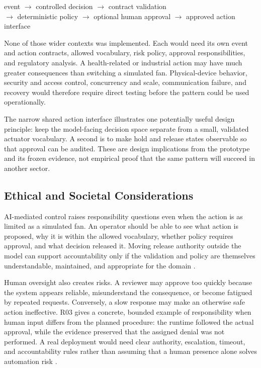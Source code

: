 \begin{center}
\small
event $\rightarrow$ controlled decision $\rightarrow$ contract validation\\
$\rightarrow$ deterministic policy $\rightarrow$ optional human approval
$\rightarrow$ approved action interface
\end{center}

None of those wider contexts was implemented. Each would need its own event and
action contracts, allowed vocabulary, risk policy, approval responsibilities,
and regulatory analysis. A health-related or industrial action may have much
greater consequences than switching a simulated fan. Physical-device behavior,
security and access control, concurrency and scale, communication failure, and
recovery would therefore require direct testing before the pattern could be
used operationally.

The narrow shared action interface illustrates one potentially useful design
principle: keep the model-facing decision space separate from a small,
validated actuator vocabulary. A second is to make hold and release states
observable so that approval can be audited. These are design implications from
the prototype and its frozen evidence, not empirical proof that the same pattern
will succeed in another sector.

\subsection{Ethical and Societal Considerations}\label{subsec:discussion-ethics}

AI-mediated control raises responsibility questions even when the action is as
limited as a simulated fan. An operator should be able to see what action is
proposed, why it is within the allowed vocabulary, whether policy requires
approval, and what decision released it. Moving release authority outside the
model can support accountability only if the validation and policy are themselves
understandable, maintained, and appropriate for the domain
\cite{nist2023airmf}.

Human oversight also creates risks. A reviewer may approve too quickly because
the system appears reliable, misunderstand the consequence, or become fatigued
by repeated requests. Conversely, a slow response may make an otherwise safe
action ineffective. R03 gives a concrete, bounded example of responsibility
when human input differs from the planned procedure: the runtime followed the
actual approval, while the evidence preserved that the assigned denial was not
performed. A real deployment would need clear authority, escalation, timeout,
and accountability rules rather than assuming that a human presence alone
solves automation risk
\cite{parasuraman2010automationbias,amershi2019guidelines,dzindolet2003trust}.

